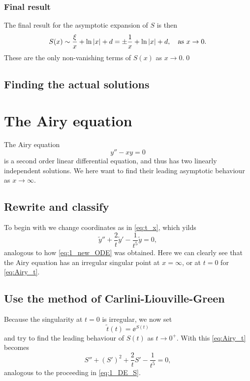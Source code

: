 \documentclass[11pt,letter, swedish, english
]{article}
\renewcommand{\thesubsubsection}{\arabic{section} (\alph{subsection},\,\roman{subsubsection})}
\newcommand{\as}{\qcomma\text{as }}
\begin{document}
\subsubsection*{Final result}
The final result for the asymptotic expansion of $S$ is then
\begin{equation}
S(x)\sim \frac{\xi}{x}+\ln|x|+d = \pm\frac{1}{x}+\ln|x|+d\as x\to0.
\end{equation}
These are the only non-vanishing terms of $S(x)$ as $x\to0$.\qed


\subsection{Finding the actual solutions}






\section{The Airy equation}
\newcommand{\xtoi}{\ensuremath{x\to\infty}}
\newcommand{\ttoz}{\ensuremath{t\to0^+}}
\renewcommand{\thesubsubsection}{(\roman{subsubsection})}

The Airy equation
\begin{equation}\label{eq:Airy}
y''-xy=0
\end{equation}
is a second order linear differential equation, and thus has two
linearly independent solutions. We here want to find their leading
asymptotic behaviour as \xtoi. 

\subsection*{Rewrite and classify}
To begin with we change coordinates as in \eqref{eq:t_x}, which yilds 
\begin{equation}\label{eq:Airy_t}
\tilde{y}''+\frac{2}{t}\tilde{y}'-\frac{1}{t^5}\tilde{y} = 0,
\end{equation}
analogous to how \eqref{eq:1_new_ODE} was obtained. Here we can
clearly see that the Airy equation has an irregular singular point at
$x=\infty$, or at $t=0$ for \eqref{eq:Airy_t}.

\subsection*{Use the method of Carlini-Liouville-Green}
Because the singularity at $t=0$ is irregular, we now set
\begin{equation}
\tilde{t}(t)=\ee^{S(t)}
\end{equation}
and try to find the leading behaviour of $S(t)$ as \ttoz. With this
\eqref{eq:Airy_t} becomes
\begin{equation}\label{eq:Airy_S}
S''+(S')^2+\frac{2}{t}S'-\frac{1}{t^5}=0,
\end{equation}
analogous to the proceeding in \eqref{eq:1_DE_S}. 
\end{document}
